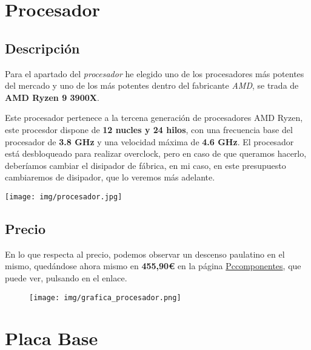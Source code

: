 \documentclass{article}
\begin{document}
    \section{Procesador}
      \subsection{Descripción}
        Para el apartado del \textit{procesador} he elegido uno de los procesadores más potentes del mercado y uno de los más potentes dentro del fabricante \textit{AMD}, se trada de \textbf{AMD Ryzen 9 3900X}.
        \\
        \begin{minipage}{0.5\textwidth}
          Este procesador pertenece a la tercena generación de procesadores AMD Ryzen, este procesdor dispone de \textbf{12 nucles y 24 hilos}, con una frecuencia base del procesador de \textbf{3.8 GHz} y una velocidad 
          máxima de \textbf{4.6 GHz}. El procesador está desbloqueado para realizar overclock, pero en caso de que queramos hacerlo, deberíamos cambiar el disipador de fábrica, en mi caso, en este presupuesto cambiaremos 
          de disipador, que lo veremos más adelante.
        \end{minipage}
        \begin{minipage}{\textwidth}
          \texttt{[image: img/procesador.jpg]}
        \end{minipage}
      \subsection{Precio}
        En lo que respecta al precio, podemos observar un descenso paulatino en el mismo, quedándose ahora mismo en \textbf{455,90€} en la página \href{https://www.pccomponentes.com/amd-ryzen-9-3900x-38-ghz-box}{Pccomponentes}, 
        que puede ver, pulsando en el enlace.
        \\
        \begin{figure}[h]
          \centering
          \texttt{[image: img/grafica\_procesador.png]}
        \end{figure}
  
  \newpage
    \section{Placa Base}
\end{document}

